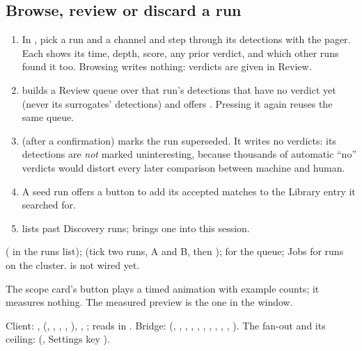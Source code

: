\subsection*{Browse, review or discard a run}
\begin{enumerate}
  \item In , pick a run and a channel and step through its detections with
        the pager. Each shows its time, depth, score, any prior verdict, and which other runs found
        it too. Browsing writes nothing: verdicts are given in Review.
  \item {} builds a Review queue over that run's detections that have
        no verdict yet (never its surrogates' detections) and offers . Pressing it
        again reuses the same queue.
  \item {} (after a confirmation) marks the run superseded. It writes no verdicts:
        its detections are \emph{not} marked uninteresting, because thousands of automatic ``no''
        verdicts would distort every later comparison between machine and human.
  \item A seed run offers a button to add its accepted matches to the Library entry it searched
        for.
  \item {} lists past Discovery runs;  brings one into this session.
\end{enumerate}

 ( in the runs list);  (tick two
runs, A and B, then );  for the queue; Jobs for runs on the
cluster.  is not wired yet.

\begin{watchout}
The scope card's  button plays a timed animation with example counts;
it measures nothing. The measured preview is the one in the  window.
\end{watchout}

\begin{underthehood}
Client: ,  (,
, , , ), ,
; reads in . Bridge:
 (, , ,
, , , , ,
, , ). The fan-out and its
ceiling:  (, Settings key
).
\end{underthehood}

